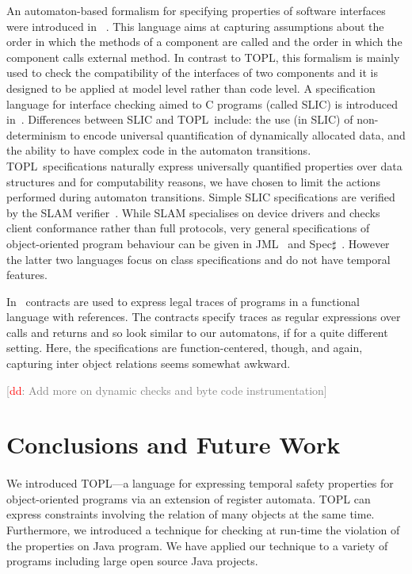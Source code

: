 \documentclass{llncs} %
\newcommand{\TPL}{TOPL}
\newcommand{\noterg}[2]{\textcolor{gray}{[\textcolor{red}{#1}: #2]}}
\newcommand{\dd}[1]{\noterg{dd}{#1}}
\newcommand{\dinocomment}[1]{\dd{#1}}
\begin{document}
An automaton-based formalism for specifying properties of software interfaces were introduced in~\cite{dblp:conf/sigsoft/AlfaroH01} . 
This language aims at capturing assumptions about the order in which the methods of a component are called and the order in which the component calls external method.
In contrast to \TPL, this formalism is mainly used to check the compatibility of the interfaces of two components and it is designed to be applied at  model level rather than code level. A specification language for interface checking aimed to C programs (called SLIC) is introduced in~\cite{ball2002}.  
Differences between SLIC and \TPL \ include: the use (in SLIC) of
non-determinism to encode universal quantification of dynamically allocated data, and the  ability to have complex code in the automaton transitions. 
\TPL \ specifications naturally express universally quantified
properties over data structures and for computability reasons,  we
have chosen to limit the  actions performed during automaton transitions. 
Simple SLIC specifications are verified by  the SLAM verifier~\cite{dblp:conf/cav/ballr01}.
While SLAM specialises on device drivers and checks client conformance rather than full protocols, 
very general specifications of object-oriented program behaviour can be given in JML~\cite{jml} and Spec$\sharp$~\cite{DBLP:journals/jot/BarnettDFLS04}. However the latter two languages focus on class specifications and do not have temporal features.

In~\cite{disney2011} contracts are used to express legal traces of
programs in a functional language with references. The contracts
specify traces as regular expressions over calls and returns and so
look similar to our automatons, if for a quite different
setting. Here, the specifications are function-centered, though, and
again, capturing inter object relations seems somewhat awkward.

\dinocomment{Add more on dynamic checks and byte code instrumentation}

\section{Conclusions and Future Work}\label{sec:conclusions} %

\paragraph{}
We introduced TOPL---a language for expressing temporal safety properties for object-oriented programs
via an extension of register automata.
TOPL can express constraints involving the relation of many objects at the same time. 
Furthermore, we introduced a technique for checking at run-time the violation of the properties
on Java program. We have applied our technique to a variety of programs including large open source Java projects.
%
\end{document}
